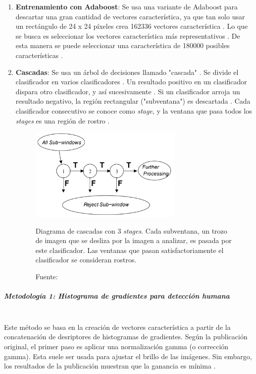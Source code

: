 \documentclass[a4paper,openright,12pt]{report}
\begin{document}
\begin{enumerate}
    \item \textbf{Entrenamiento con  Adaboost}: 
    Se usa una variante de Adaboost para descartar una gran cantidad de vectores
    característica, ya que tan solo usar un rectángulo de 24 x 24 píxeles crea
    162336 vectores característica \cite{wang2014analysis}.
    Lo que se busca es seleccionar los vectores característica más
    representativos \cite{violajones}. De esta manera se puede seleccionar una
    característica de 180000 posibles características \cite{violajones}.

    \item \textbf{Cascadas}:
    Se usa un árbol de decisiones llamado "cascada" \cite{violajones}.
    Se divide el clasificador en varios clasificadores \cite{violajones}.
    Un resultado positivo en un clasificador dispara otro clasificador, y así
    sucesivamente \cite{violajones}. Si un clasificador arroja un resultado
    negativo, la región rectangular ("subventana") es descartada
    \cite{violajones}. Cada clasificador consecutivo se conoce como
    \textit{stage}, y la ventana que pasa todos los \textit{stages} es una
    región de rostro \cite{violajones}.

    \begin{figure}[H]
      \centering
        \includegraphics[width=0.7\textwidth]{../images/cascade-diagram.png}\par
      \caption{Diagrama de cascadas con 3 \textit{stages}. Cada subventana, un
      trozo de imagen que se desliza por la imagen a analizar, es pasada por
      este clasificador. Las ventanas que pasan satisfactoriamente el
      clasificador se consideran rostros.}
      \caption*{Fuente: \cite{violajones}}
      \label{fig:cascades-diagram}
    \end{figure}
\end{enumerate}

\subparagraph{Metodología 1: Histograma de gradientes para detección humana}\mbox{} \\
Este método se basa en la creación de vectores característica a partir de la
concatenación de desriptores de histogramas de gradientes. Según la publicación
original, el primer paso es aplicar una normalización gamma (o corrección
gamma). Esta suele ser usada para ajustar el brillo de las imágenes. Sin
embargo, los resultados de la publicación muestran que la ganancia es mínima
\cite{dalal2005histograms}.\\
\end{document}
